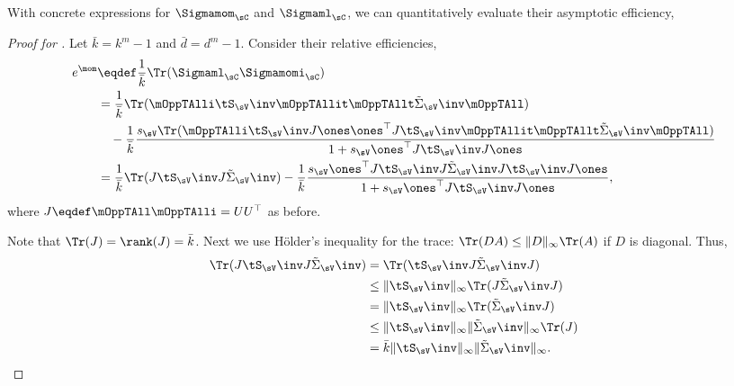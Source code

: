 With concrete expressions for $\Sigmamom_\sC$ and $\Sigmaml_\sC$, we can quantitatively evaluate their asymptotic efficiency,
\begin{proof}[Proof for ]
  Let $\bar k = k^m -1$ and $\bar d = d^m -1$. Consider their relative
  efficiencies, 
  \begin{align*}
    e^\mom 
        &\eqdef \frac{1}{\bar k} \Tr(\Sigmaml_\sC\Sigmamomi_\sC ) \\
        &= \frac{1}{\bar k} \Tr( \mOppTAlli \tS_\sV\inv \mOppTAllit \mOppTAllt \tilde\Sigma_\sV\inv \mOppTAll ) \\
      &\quad - \frac{1}{\bar k} \frac{s_\sV \Tr( \mOppTAlli \tS_\sV\inv J \ones \ones^\top J \tS_\sV\inv \mOppTAllit \mOppTAllt  \tilde\Sigma_\sV\inv \mOppTAll  )}
      {1 + s_\sV \ones^\top J \tS_\sV\inv J \ones} \\
        &= \frac{1}{\bar k} \Tr( J \tS_\sV\inv J \tilde\Sigma_\sV\inv ) - \frac{1}{\bar k} \frac{s_\sV \ones^\top J \tS_\sV\inv J \tilde\Sigma_\sV\inv J \tS_\sV\inv J \ones }
      {1 + s_\sV \ones^\top J \tS_\sV\inv J \ones},
  \end{align*}
  where $J \eqdef \mOppTAll \mOppTAlli = U U^\top$ as before. 
  
  Note that $\Tr(J) = \rank(J) = {\bar k}$.
  Next we use H\"{o}lder's inequality for the trace: $\Tr(D A) \le
  \|D\|_\infty \Tr(A)$ if $D$ is diagonal. Thus,
  \begin{align*}
      \Tr( J \tS_\sV\inv J \tilde\Sigma_\sV\inv ) 
        &= \Tr( \tS_\sV\inv J \tilde\Sigma_\sV\inv J ) \\
        &\le \|\tS_\sV\inv\|_\infty \Tr( J \tilde\Sigma_\sV\inv J ) \\
        &= \|\tS_\sV\inv\|_\infty \Tr( \tilde\Sigma_\sV\inv J ) \\
        &\le \|\tS_\sV\inv\|_\infty \|\tilde\Sigma_\sV\inv\|_\infty \Tr( J ) \\
        &= {\bar k} \|\tS_\sV\inv\|_\infty \|\tilde\Sigma_\sV\inv\|_\infty.
  \end{align*}


\end{proof}
